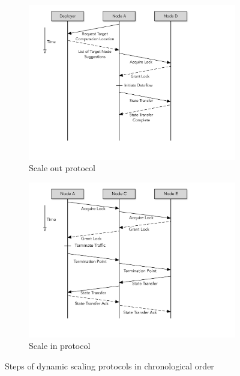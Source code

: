 \begin{figure}
        \begin{subfigure}{0.45\textwidth}
                \centering
                \includegraphics[scale=0.45, valign=t]{figures/scale-out.pdf}
                \caption{Scale out protocol}
                \label{fig:scale-out-protocol}    
        \end{subfigure}
        \begin{subfigure}{0.45\textwidth}
                \centering
                \includegraphics[scale=0.45, valign=t]{figures/scale-in.pdf} 
                \caption{Scale in protocol}
                \label{fig:scale-in-protocol}
        \end{subfigure}
        \caption{Steps of dynamic scaling protocols in chronological order}
        \label{fig:dynamic-scaling-protocols}
\end{figure}
%
